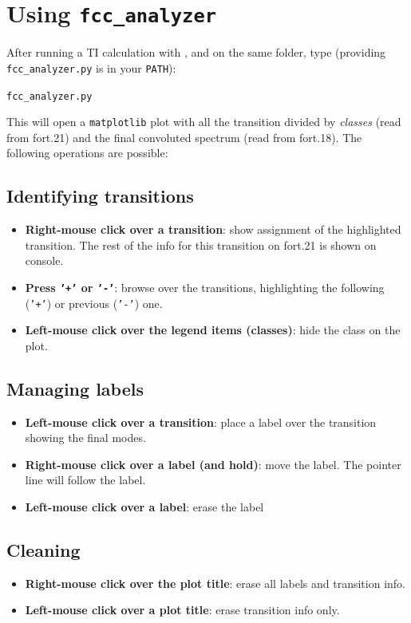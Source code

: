 \documentclass[a4paper,11pt]{article}
\begin{document}
\section{Using \texttt{fcc\_analyzer}}
After running a TI calculation with \fcc, and on the same folder, type (providing \texttt{fcc\_analyzer.py} is in your \texttt{PATH}):
\vspace*{0.2cm}

\texttt{fcc\_analyzer.py}
\vspace*{0.2cm}

\noindent This will open a \texttt{matplotlib} plot with all the transition divided by \textit{classes} (read from fort.21) and the final convoluted spectrum (read from fort.18). The following operations are possible:

\subsection{Identifying transitions}
\begin{itemize}
 \item \textbf{Right-mouse click over a transition}: show assignment of the highlighted transition. The rest of the info for this transition on fort.21 is shown on console.
 \item \textbf{Press \texttt{'+'} or \texttt{'-'}}: browse over the transitions, highlighting the following (\texttt{'+'}) or previous (\texttt{'-'}) one.
  \item \textbf{Left-mouse click over the legend items (classes)}: hide the class on the plot.
\end{itemize}

\subsection{Managing labels}
\begin{itemize}
 \item \textbf{Left-mouse click over a transition}: place a label over the transition showing the final modes.
 \item \textbf{Right-mouse click over a label (and hold)}: move the label. The pointer line will follow the label.
 \item \textbf{Left-mouse click over a label}: erase the label
\end{itemize}

\subsection{Cleaning}
\begin{itemize}
 \item \textbf{Right-mouse click over the plot title}: erase all labels and transition info.
 \item \textbf{Left-mouse click over a plot title}: erase transition info only.
\end{itemize}
\end{document}

